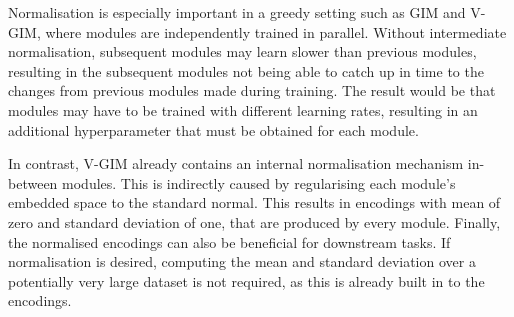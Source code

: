 		Normalisation is especially important in a greedy setting such as GIM and V-GIM, where modules are independently trained in parallel. Without intermediate normalisation, subsequent modules may learn slower than previous modules, resulting in the subsequent modules not being able to catch up in time to the changes from previous modules made during training. The result would be that modules may have to be trained with different learning rates, resulting in an additional hyperparameter that must be obtained for each module.
		
		In contrast, V-GIM already contains an internal normalisation mechanism in-between modules. This is indirectly caused by regularising each module's embedded space to the standard normal. This results in encodings with mean of zero and standard deviation of one, that are produced by every module. Finally, the normalised encodings can also be beneficial for downstream tasks. If normalisation is desired, computing the mean and standard deviation over a potentially very large dataset is not required, as this is already built in to the encodings.

	
	

	






%
%
%		






